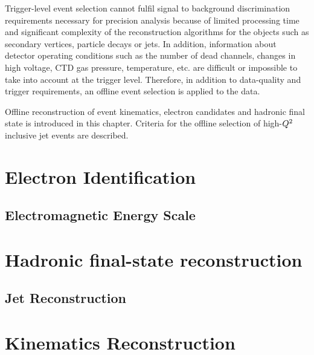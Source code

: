 Trigger-level event selection cannot fulfil signal to background discrimination requirements necessary for precision analysis because of limited processing time and significant complexity of the reconstruction algorithms for the objects such as secondary vertices, particle decays or jets. In addition, information about detector operating conditions such as the number of dead channels, changes in high voltage, CTD gas pressure, temperature, etc. are difficult or impossible to take into account at the trigger level. Therefore, in addition to data-quality and trigger requirements, an offline event selection is applied to the data.

Offline reconstruction of event kinematics, electron candidates and hadronic final state is introduced in this chapter. Criteria for the offline selection of high-$\mbox{${Q^2}$}$ inclusive jet events are described. 

\section{Electron Identification}
\label{sec:eleid}


\subsection{Electromagnetic Energy Scale}
\label{subsec:eleenescale}


\section{Hadronic final-state reconstruction}
\label{sec:hadronreco}


\subsection{Jet Reconstruction}
\label{sec:jetreco}


\section{Kinematics Reconstruction}
\label{sec:kinrec}



